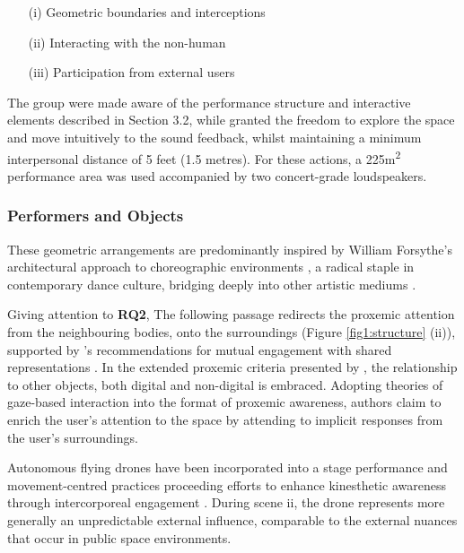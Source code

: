\begin{itemize}
    \item[(i)] Geometric boundaries and interceptions
    \item[(ii)] Interacting with the non-human
    \item[(iii)] Participation from external users
\end{itemize}

The group were made aware of the performance structure and interactive elements described in Section 3.2, while granted the freedom to explore the space and move intuitively to the sound feedback, whilst maintaining a minimum interpersonal distance of 5 feet (1.5 metres). For these actions, a 225m\textsuperscript{2} performance area was used accompanied by two concert-grade loudspeakers.

\subsubsection{Performers and Objects}
\label{sec:structure_2}

These geometric arrangements are predominantly inspired by William Forsythe's architectural approach to choreographic environments \citep{forsythe_dance_1999}, a radical staple in contemporary dance culture, bridging deeply into other artistic mediums \citep{clark_geometry_2014}.

Giving attention to \textbf{RQ2}, The following passage redirects the proxemic attention from the neighbouring bodies, onto the surroundings (Figure \ref{fig1:structure} (ii)), supported by \citeauthor{bryan-kinns_mutual_2013}'s recommendations for mutual engagement with shared representations \cite{bryan-kinns_mutual_2013}. In the extended proxemic criteria presented by \cite{ballendat_proxemic_2010}, the relationship to other objects, both digital and non-digital is embraced. Adopting theories of gaze-based interaction into the format of proxemic awareness, authors claim to enrich the user's attention to the space by attending to implicit responses from the user's surroundings.

Autonomous flying drones have been incorporated into a stage performance \citep{eriksson_dancing_2019} and movement-centred practices \citep{la_delfa_drone_2020} proceeding efforts to enhance kinesthetic awareness through intercorporeal engagement \citep{tezza_state---art_2019}. During scene ii, the drone represents more generally an unpredictable external influence, comparable to the external nuances that occur in public space environments.

